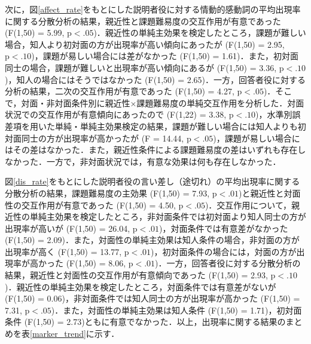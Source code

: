 \documentclass[japanese]{jnlp_1.3a}
\begin{document}
次に，図\ref{affect_rate}をもとにした説明者役に対する情動的感動詞の平均出現率に関する分散分析の結果，親近性と課題難易度の交互作用が有意であった (F(1,50) = 5.99, $\mathrm{p} < .05$)．親近性の単純主効果を検定したところ，課題が難しい場合，知人より初対面の方が出現率が高い傾向にあったが (F(1,50) = 2.95, $\mathrm{p} < .10$)，課題が易しい場合には差がなかった (F(1,50) = 1.61)．また，初対面同士の場合，課題が難しいと出現率が高い傾向にあるが (F(1,50) = 3.36, $\mathrm{p} < .10$)，知人の場合にはそうではなかった (F(1,50) = 2.65)．一方，回答者役に対する分析の結果，二次の交互作用が有意であった (F(1,50) = 4.27, $\mathrm{p} < .05$)．そこで，対面・非対面条件別に親近性×課題難易度の単純交互作用を分析した．対面状況での交互作用が有意傾向にあったので (F(1,22) = 3.38, $\mathrm{p} < .10$)，水準別誤差項を用いた単純・単純主効果検定の結果，課題が難しい場合には知人よりも初対面同士の方が出現率が高かったが (F = 14.44, $\mathrm{p} < .05$)，課題が易しい場合にはその差はなかった．また，親近性条件による課題難易度の差はいずれも存在しなかった．一方で，非対面状況では，有意な効果は何も存在しなかった．

図\ref{dis_rate}をもとにした説明者役の言い差し（途切れ）の平均出現率に関する分散分析の結果，課題難易度の主効果 (F(1,50) = 7.93, $\mathrm{p} < .01$)と親近性と対面性の交互作用が有意であった (F(1,50) = 4.50, $\mathrm{p} < .05$)．交互作用について，親近性の単純主効果を検定したところ，非対面条件では初対面より知人同士の方が出現率が高いが (F(1,50) = 26.04, $\mathrm{p} < .01$)，対面条件では有意差がなかった (F(1,50) = 2.09)．また，対面性の単純主効果は知人条件の場合，非対面の方が出現率が高く (F(1,50) = 13.77, $\mathrm{p} < .01$)，初対面条件の場合には，対面の方が出現率が高かった (F(1,50) = 8.06, $\mathrm{p} < .01$)．一方，回答者役に対する分散分析の結果，親近性と対面性の交互作用が有意傾向であった (F(1,50) = 2.93, $\mathrm{p} < .10$)．親近性の単純主効果を検定したところ，対面条件では有意差がないが (F(1,50) = 0.06)，非対面条件では知人同士の方が出現率が高かった (F(1,50) = 7.31, $\mathrm{p} < .05$)．また，対面性の単純主効果は知人条件 (F(1,50) = 1.71)，初対面条件 (F(1,50) = 2.73)ともに有意でなかった．以上，出現率に関する結果のまとめを表\ref{marker_trend}に示す．
\end{document}

